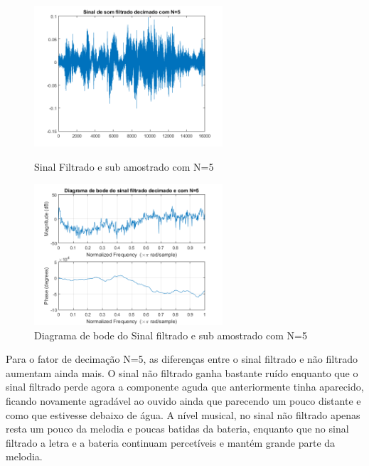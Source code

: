 \documentclass[11pt]{article}
\begin{document}
\newpage
\begin{figure}[h]
\begin{center}
\begin{minipage}[b]{0.45\linewidth}
\includegraphics[width=7cm]{fds5.png}
\caption{Sinal Filtrado e sub amostrado com N=5}
\label{figura11}
\end{minipage}
\begin{minipage}[b]{0.45\linewidth}
\includegraphics[width=7cm]{fdb5.png}
\caption{Diagrama de bode do Sinal filtrado e sub amostrado com N=5}
\label{figura}
\end{minipage}
\end{center}
\end{figure}
Para o fator de decimação N=5, as diferenças entre o sinal filtrado e não filtrado aumentam ainda mais. O sinal não filtrado ganha bastante ruído enquanto que o sinal filtrado perde agora a componente aguda que anteriormente tinha aparecido, ficando novamente agradável ao ouvido ainda que parecendo um pouco distante e como que estivesse debaixo de água. A nível musical, no sinal não filtrado apenas resta um pouco da melodia e poucas batidas da bateria, enquanto que no sinal filtrado a letra e a bateria continuam percetíveis e mantém grande parte da melodia.

\newpage
\end{document}
